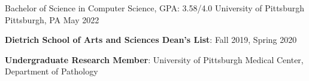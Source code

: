 
\begin{cventries}
  \cventry
    {Bachelor of Science in Computer Science, GPA: 3.58/4.0} %
    {University of Pittsburgh} %
    {Pittsburgh, PA} %
    {May 2022} %
    {
      \begin{cvitems} %
         \item {\textbf{Dietrich School of Arts and Sciences Dean's List}: Fall 2019, Spring 2020}
         \vspace{0.5mm}
         \item {\textbf{Undergraduate Research Member}: University of Pittsburgh Medical Center, Department of Pathology}
      \end{cvitems}
    }
\end{cventries}

